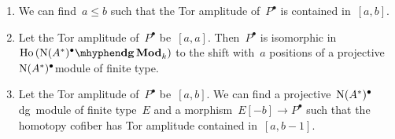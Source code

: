 \begin{refsection}
\begin{proposition}
\begin{enumerate}
    \item\label{enumerate:Tor-amplitude-5} We can find~$a\leq b$ such that the Tor amplitude of~$P^\bullet$ is contained in~$[a,b]$.
    \item\label{enumerate:Tor-amplitude-6} Let the Tor amplitude of~$P^\bullet$ be~$[a,a]$. Then~$P^\bullet$ is isomorphic in~$\Ho(\dgMod{\nerve(A^*)^\bullet}_k)$ to the shift with~$a$ positions of a projective~$\operatorname{N}(A^*)^\bullet$\dash module of finite type.
    \item\label{enumerate:Tor-amplitude-7} Let the Tor amplitude of~$P^\bullet$ be~$[a,b]$. We can find a projective~$\operatorname{N}(A^*)^\bullet$\dash dg~module of finite type~$E$ and a morphism~$E[-b]\to P^\bullet$ such that the homotopy cofiber has Tor amplitude contained in~$[a,b-1]$.
  \end{enumerate}
\end{proposition}



\end{refsection}
